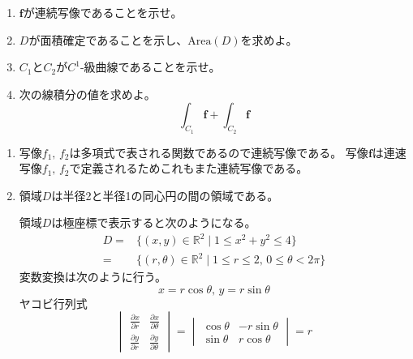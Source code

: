 \documentclass[12pt,b5paper]{ltjsarticle}
\begin{document}
\begin{enumerate}
      \begin{enumerate}
       \item $\bm{f}$が連続写像であることを示せ。
       \item $D$が面積確定であることを示し、$\mathrm{Area}(D)$を求めよ。
       \item $C_1$と$C_2$が$C^1$-級曲線であることを示せ。
       \item 次の線積分の値を求めよ。
             \begin{equation}
              \int_{C_1}\bm{f} + \int_{C_2}\bm{f}
             \end{equation}
      \end{enumerate}

      \dotfill

      \begin{enumerate}
       \item
            写像$f_1,\,f_2$は多項式で表される関数であるので連続写像である。
            写像$\bm{f}$は連速写像$f_1,\,f_2$で定義されるためこれもまた連続写像である。

       \item
            領域$D$は半径2と半径1の同心円の間の領域である。

            領域$D$は極座標で表示すると次のようになる。
            \begin{align}
             D =& \{ (x,y)\in\mathbb{R}^2 \mid 1\leq x^2 + y^2 \leq 4 \}\\
             =& \{ (r, \theta)\in\mathbb{R}^2 \mid 1\leq r \leq 2,\, 0\leq \theta <2\pi \}
            \end{align}
            変数変換は次のように行う。
            \begin{equation}
             x=r\cos\theta,\, y=r\sin\theta
            \end{equation}
            ヤコビ行列式
            \begin{equation}
             \begin{vmatrix}
              \frac{\partial x}{\partial r} & \frac{\partial x}{\partial \theta}\\
              \frac{\partial y}{\partial r} & \frac{\partial y}{\partial \theta}
             \end{vmatrix}
             =
             \begin{vmatrix}
              \cos\theta & -r\sin\theta\\
              \sin\theta & r\cos\theta
             \end{vmatrix}
             =r
            \end{equation}


\end{enumerate}
\end{enumerate}
\end{document}
